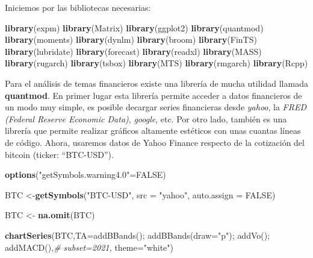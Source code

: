\documentclass[
]{book}
\newenvironment{Shaded}{\begin{snugshade}}{\end{snugshade}}
\newcommand{\AttributeTok}[1]{\textcolor[rgb]{0.13,0.29,0.53}{#1}}
\newcommand{\CommentTok}[1]{\textcolor[rgb]{0.56,0.35,0.01}{\textit{#1}}}
\newcommand{\ConstantTok}[1]{\textcolor[rgb]{0.56,0.35,0.01}{#1}}
\newcommand{\FunctionTok}[1]{\textcolor[rgb]{0.13,0.29,0.53}{\textbf{#1}}}
\newcommand{\NormalTok}[1]{#1}
\newcommand{\OtherTok}[1]{\textcolor[rgb]{0.56,0.35,0.01}{#1}}
\newcommand{\StringTok}[1]{\textcolor[rgb]{0.31,0.60,0.02}{#1}}
\begin{document}
Iniciemos por las bibliotecas necesarias:

\begin{Shaded}
\begin{Highlighting}[]
\FunctionTok{library}\NormalTok{(expm)}
\FunctionTok{library}\NormalTok{(Matrix)}
\FunctionTok{library}\NormalTok{(ggplot2)}
\FunctionTok{library}\NormalTok{(quantmod)}
\FunctionTok{library}\NormalTok{(moments)}
\FunctionTok{library}\NormalTok{(dynlm)}
\FunctionTok{library}\NormalTok{(broom)}
\FunctionTok{library}\NormalTok{(FinTS)}
\FunctionTok{library}\NormalTok{(lubridate)}
\FunctionTok{library}\NormalTok{(forecast)}
\FunctionTok{library}\NormalTok{(readxl)}
\FunctionTok{library}\NormalTok{(MASS)}
\FunctionTok{library}\NormalTok{(rugarch)}
\FunctionTok{library}\NormalTok{(tsbox)}
\FunctionTok{library}\NormalTok{(MTS)}
\FunctionTok{library}\NormalTok{(rmgarch)}
\FunctionTok{library}\NormalTok{(Rcpp)}
\end{Highlighting}
\end{Shaded}

Para el análisis de temas financieros existe una librería de mucha utilidad llamada \textbf{quantmod}. En primer lugar esta librería permite acceder a datos financieros de un modo muy simple, es posible decargar series financieras desde \emph{yahoo}, la \emph{FRED (Federal Reserve Economic Data)}, \emph{google}, etc. Por otro lado, también es una librería que permite realizar gráficos altamente estéticos con unas cuantas líneas de código. Ahora, usaremos datos de Yahoo Finance respecto de la cotización del bitcoin (ticker: ``BTC-USD'').

\begin{Shaded}
\begin{Highlighting}[]
\FunctionTok{options}\NormalTok{(}\StringTok{"getSymbols.warning4.0"}\OtherTok{=}\ConstantTok{FALSE}\NormalTok{)}

\NormalTok{BTC }\OtherTok{\textless{}{-}}\FunctionTok{getSymbols}\NormalTok{(}\StringTok{"BTC{-}USD"}\NormalTok{, }\AttributeTok{src =} \StringTok{"yahoo"}\NormalTok{, }\AttributeTok{auto.assign =} \ConstantTok{FALSE}\NormalTok{)}

\NormalTok{BTC }\OtherTok{\textless{}{-}} \FunctionTok{na.omit}\NormalTok{(BTC)}

\FunctionTok{chartSeries}\NormalTok{(BTC,}\AttributeTok{TA=}\StringTok{\textquotesingle{}addBBands();}
\StringTok{                    addBBands(draw="p");}
\StringTok{                    addVo();}
\StringTok{                    addMACD()\textquotesingle{}}\NormalTok{,}\CommentTok{\# subset=\textquotesingle{}2021\textquotesingle{},}
                \AttributeTok{theme=}\StringTok{"white"}\NormalTok{)}
\end{Highlighting}
\end{Shaded}
\end{document}
